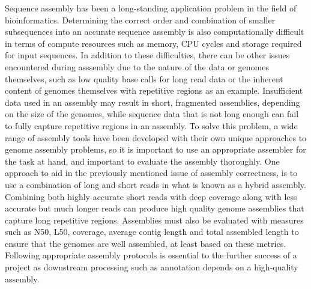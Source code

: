 \documentclass[12pt]{article}
\begin{document}
Sequence assembly has been a long-standing application problem in the
field of bioinformatics\cite{assembly}. Determining the correct order
and combination of smaller subsequences into an accurate sequence
assembly is also computationally difficult in terms of compute
resources such as memory, CPU cycles and storage required for input
sequences\cite{assembly}. In addition to these difficulties, there can
be other issues encountered during asssembly due to the nature of
the data or genomes themselves, such as low quality base calls for
long read data or the inherent content of genomes themselves with
repetitive regions as an example. Insufficient data used in an
assembly may result in short, fragmented assemblies, depending on the
size of the genomes, while sequence data that is not long enough can
fail to fully capture repetitive regions in an assembly. To solve this
problem, a wide range of assembly tools have been developed with their
own unique approaches to genome assembly problems, so it is important
to use an appropriate assembler for the task at hand, and important to
evaluate the assembly thoroughly. One approach to aid in the
previously mentioned issue of assembly correctness, is to use a
combination of long and short reads in what is known as a hybrid
assembly. Combining both highly accurate short reads with deep
coverage along with less accurate but much longer reads can produce
high quality genome assemblies that capture long repetitive
regions. Assemblies must also be evaluated with measures such as N50,
L50, coverage, average contig length and total assembled length to
ensure that the genomes are well assembled, at least based on these
metrics\cite{assembly}. Following appropriate assembly protocols is
essential to the further success of a project as downstream processing
such as annotation depends on a high-quality assembly.
\end{document}
